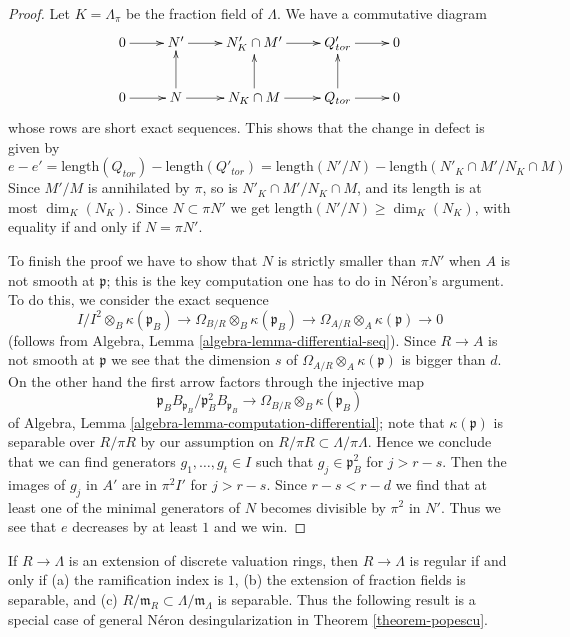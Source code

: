 \begin{proof}
\medskip\noindent
Let $K = \Lambda_\pi$ be the fraction field of $\Lambda$.
We have a commutative diagram
$$
\xymatrix{
0 \ar[r] &
N' \ar[r] &
N'_K \cap M' \ar[r] &
Q'_{tor} \ar[r] &
0 \\
0 \ar[r] &
N \ar[r] \ar[u] &
N_K \cap M \ar[r] \ar[u] &
Q_{tor} \ar[r] \ar[u] &
0
}
$$
whose rows are short exact sequences. This shows that the change in defect
is given by
$$
e - e' =
\text{length}(Q_{tor}) - \text{length}(Q'_{tor})
=
\text{length}(N'/N) - \text{length}(N'_K \cap M' / N_K \cap M)
$$
Since $M'/M$ is annihilated by $\pi$, so is $N'_K \cap M' / N_K \cap M$,
and its length is at most $\dim_K(N_K)$.
Since $N \subset \pi N'$ we get $\text{length}(N'/N) \ge \dim_K(N_K)$,
with equality if and only if $N = \pi N'$.

\medskip\noindent
To finish the proof we have to show that $N$ is strictly smaller
than $\pi N'$ when $A$ is not smooth at $\mathfrak p$;
this is the key computation one has to do in N\'eron's argument.
To do this, we consider the exact sequence
$$
I/I^2 \otimes_B \kappa(\mathfrak p_B)
\to \Omega_{B/R} \otimes_B \kappa(\mathfrak p_B)
\to \Omega_{A/R} \otimes_A \kappa(\mathfrak p) \to 0
$$
(follows from Algebra, Lemma \ref{algebra-lemma-differential-seq}).
Since $R \to A$ is not smooth at $\mathfrak p$ we see that the dimension $s$ of
$\Omega_{A/R} \otimes_A \kappa(\mathfrak p)$
is bigger than $d$. On the other hand
the first arrow factors through the injective map
$$
\mathfrak p_B B_{\mathfrak p_B}/\mathfrak p_B^2 B_{\mathfrak p_B}
\to \Omega_{B/R} \otimes_B \kappa(\mathfrak p_B)
$$
of Algebra, Lemma \ref{algebra-lemma-computation-differential};
note that $\kappa(\mathfrak p)$ is separable over $R/\pi R$
by our assumption on $R/\pi R \subset \Lambda/\pi \Lambda$.
Hence we conclude that we can find generators
$g_1, \ldots, g_t \in I$ such that $g_j \in \mathfrak p_B^2$
for $j > r - s$. Then the images of $g_j$ in $A'$ are in $\pi^2 I'$
for $j > r - s$. Since $r - s < r - d$
we find that at least one of the minimal generators
of $N$ becomes divisible by $\pi^2$ in $N'$.
Thus we see that $e$ decreases by at least $1$ and we win.
\end{proof}

\noindent
If $R \to \Lambda$ is an extension of discrete valuation rings,
then $R \to \Lambda$ is regular if and only if
(a) the ramification index is $1$,
(b) the extension of fraction fields is separable, and
(c) $R/\mathfrak m_R \subset \Lambda/\mathfrak m_\Lambda$
is separable. Thus the following result is a special case
of general N\'eron desingularization in
Theorem \ref{theorem-popescu}.

